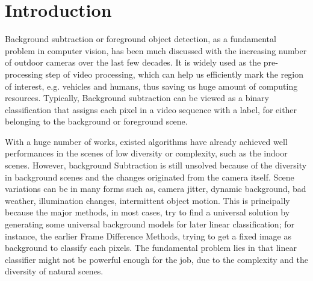 \documentclass[runningheads,a4paper]{llncs}
\newcommand{\reffig}[1]{Fig. \ref{#1}}
\begin{document}
\section{Introduction}
	Background subtraction or foreground object detection, as a fundamental problem in computer vision, has been much discussed with the increasing number of outdoor cameras over the last few decades. It is widely used as the pre-processing step of video processing, which can help us efficiently mark the region of interest, e.g. vehicles and humans, thus saving us huge amount of computing resources. Typically, Background subtraction can be viewed as a binary classification that assigns each pixel in a video sequence with a label, for either belonging to the background or foreground scene.

	With a huge number of works, existed algorithms have already achieved well performances in the scenes of low diversity or complexity, such as the indoor scenes. However, background Subtraction is still unsolved because of the diversity in background scenes and the changes originated from the camera itself. Scene variations can be in many forms such as, camera jitter, dynamic background, bad weather, illumination changes, intermittent object motion. This is principally because the major methods, in most cases, try to find a universal solution by generating some universal background models for later linear classification; for instance, the earlier Frame Difference Methods, trying to get a fixed image as background to classify each pixels. The fundamental problem lies in that linear classifier might not be powerful enough for the job, due to the complexity and the diversity of natural scenes.
\end{document}

